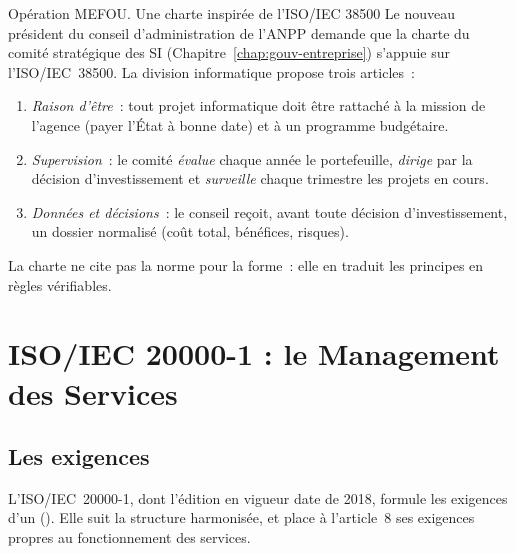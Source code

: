 \begin{boxscenario}{Opération MEFOU. Une charte inspirée de l'ISO/IEC 38500}
Le nouveau président du conseil d'administration de l'ANPP demande que la
charte du comité stratégique des SI (Chapitre~\ref{chap:gouv-entreprise})
s'appuie sur l'ISO/IEC~38500. La division informatique propose trois
articles~:
\begin{enumerate}
    \item \emph{Raison d'être}~: tout projet informatique doit être rattaché
          à la mission de l'agence (payer l'État à bonne date) et à un
          programme budgétaire.
    \item \emph{Supervision}~: le comité \emph{évalue} chaque année le
          portefeuille, \emph{dirige} par la décision d'investissement et
          \emph{surveille} chaque trimestre les projets en cours.
    \item \emph{Données et décisions}~: le conseil reçoit, avant toute
          décision d'investissement, un dossier normalisé (coût total,
          bénéfices, risques).
\end{enumerate}
La charte ne cite pas la norme pour la forme~: elle en traduit les
principes en règles vérifiables.
\end{boxscenario}

\section{ISO/IEC 20000-1 : le Management des Services}
\label{sec:c09-20000}

\subsection{Les exigences}

L'ISO/IEC~20000-1, dont l'édition en vigueur date de 2018, formule les
exigences d'un  (). Elle suit la structure
harmonisée, et place à l'article~8 ses exigences propres au
fonctionnement des services.

